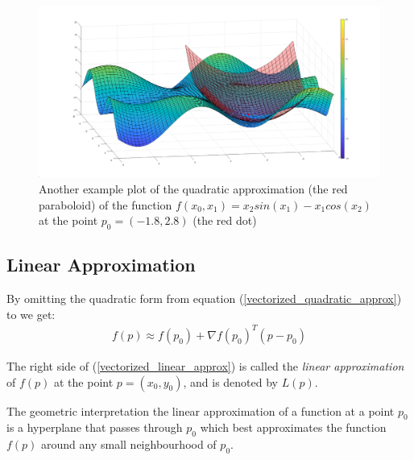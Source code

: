 \begin{figure}[ht]
\centering
\includegraphics[width=13cm]{figures/quad_approx2}
\caption[Quadratic approximation example 2]{Another example plot of the quadratic approximation (the red paraboloid) of the function $f\left(x_0, x_1\right) = x_2sin\left(x_1\right) - x_1cos\left(x_2\right)$ at the point $p_0 = \left(-1.8, 2.8\right)$ (the red dot)}
\label{fig:quad_approx2}
\end{figure}

\subsection{Linear Approximation}
By omitting the quadratic form from equation (\ref{vectorized_quadratic_approx}) to we get:
\begin{equation}\label{vectorized_linear_approx}
\begin{split}
f\left(p\right) \approx f\left(p_0\right) + \nabla f\left(p_0\right)^T\left(p-p_0\right)
\end{split}
\end{equation}

\noindent The right side of (\ref{vectorized_linear_approx}) is called the \emph{linear approximation} of $f(p)$ at the point $p=(x_0, y_0)$, and is denoted by $L(p)$.

\noindent The geometric interpretation the linear approximation of a function at a point $p_0$ is a hyperplane that passes through $p_0$ which best approximates the function $f(p)$ around any small neighbourhood of $p_0$.

